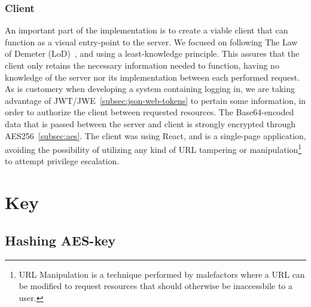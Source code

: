 \subsubsection{Client}
An important part of the implementation is to create a viable client that can
function as a visual entry-point to the server.
We focused on following The Law of Demeter (LoD)~\cite{lieberherr1990assuring},
and using a least-knowledge principle.
This assures that the client only retains the necessary information needed to
function, having no knowledge of the server nor its implementation between each
performed request.
As is customery when developing a system containing logging in, we are taking
advantage of JWT/JWE~\ref{subsec:json-web-tokens} to pertain some information,
in order to authorize the client between requested resources.
The Base64-encoded data that is passed between the server and client is
strongly encrypted through AES256~\ref{subsec:aes}.
The client was using React, and is a single-page application, avoiding the
possibility of utilizing any kind of URL tampering or manipulation\footnote{
  URL Manipulation is a technique performed by malefactors where a URL can be
  modified to request resources that should otherwise be inaccessbile to a user.
} to attempt privilege escalation.

\section{Key}\label{sec:key}
\subsection{Hashing AES-key}\label{subsec:hashing-aes-key}

